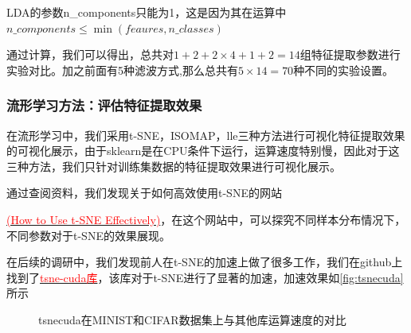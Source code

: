 \documentclass[12pt,hyperref,a4paper,UTF8]{ctexart}
\begin{document}
\par
LDA的参数n\_components只能为1，这是因为其在运算中$n\_components \le \min (feaures, n\_classes)$
\par
通过计算，我们可以得出，总共对$1+2+2\times 4 +1+2=14$组特征提取参数进行实验对比。加之前面有5种滤波方式,那么总共有$5\times 14=70$种不同的实验设置。


\subsubsection{流形学习方法：评估特征提取效果}
在流形学习中，我们采用t-SNE，ISOMAP，lle三种方法进行可视化特征提取效果的可视化展示，由于sklearn是在CPU条件下运行，运算速度特别慢，因此对于这三种方法，我们只针对训练集数据的特征提取效果进行可视化展示。
\par
通过查阅资料，我们发现关于如何高效使用t-SNE的网站{\href{https://distill.pub/2016/misread-tsne}{\textcolor{red}{(How to Use t-SNE Effectively)}}，在这个网站中，可以探究不同样本分布情况下，不同参数对于t-SNE的效果展现。
\par
在后续的调研中，我们发现前人在t-SNE的加速上做了很多工作，我们在github上找到了\href{https://github.com/CannyLab/tsne-cuda}{\textcolor{red}{tsne-cuda库}}，该库对于t-SNE进行了显著的加速，加速效果如\autoref{fig:tsnecuda}所示
\begin{figure}[htbp]
	\centering
	\caption{tsnecuda在MINIST和CIFAR数据集上与其他库运算速度的对比}
	\label{fig:tsnecuda}
\end{figure}

}
\end{document}
